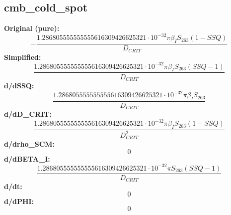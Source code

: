 \subsection{cmb_cold_spot}
\textbf{Original (pure):}
\begin{equation}
- \frac{1.286805555555555616309426625321 \cdot 10^{-32} \pi \beta_{I} S_{26 3} \left(1 - SSQ\right)}{D_{CRIT}}
\end{equation}
\textbf{Simplified:}
\begin{equation}
\frac{1.286805555555555616309426625321 \cdot 10^{-32} \pi \beta_{I} S_{26 3} \left(SSQ - 1\right)}{D_{CRIT}}
\end{equation}
\textbf{d/dSSQ:}
\begin{equation}
\frac{1.286805555555555616309426625321 \cdot 10^{-32} \pi \beta_{I} S_{26 3}}{D_{CRIT}}
\end{equation}
\textbf{d/dD_CRIT:}
\begin{equation}
\frac{1.286805555555555616309426625321 \cdot 10^{-32} \pi \beta_{I} S_{26 3} \left(1 - SSQ\right)}{D_{CRIT}^{2}}
\end{equation}
\textbf{d/drho_SCM:}
\begin{equation}
0
\end{equation}
\textbf{d/dBETA_I:}
\begin{equation}
\frac{1.286805555555555616309426625321 \cdot 10^{-32} \pi S_{26 3} \left(SSQ - 1\right)}{D_{CRIT}}
\end{equation}
\textbf{d/dt:}
\begin{equation}
0
\end{equation}
\textbf{d/dPHI:}
\begin{equation}
0
\end{equation}

